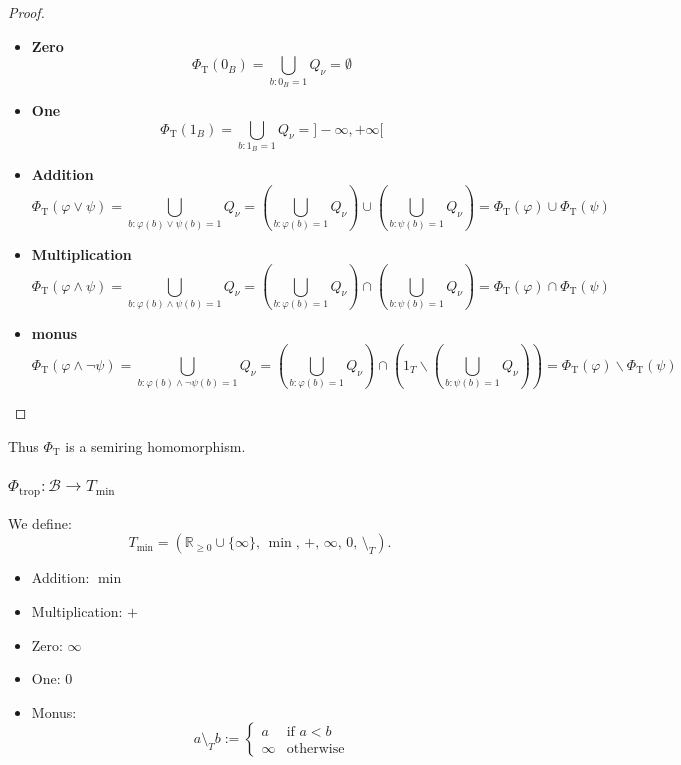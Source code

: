 \begin{proof}
\begin{itemize}
\item \textbf{Zero}
$$
\Phi_{\mathrm{T}}(0_B) = \bigcup_{b:0_B=1} Q_{\nu} = \emptyset
$$

\item
\textbf{One}
$$
\Phi_{\mathrm{T}}(1_B) = \bigcup_{b:1_B=1} Q_{\nu} = ]-\infty, +\infty[
$$
\item
\textbf{Addition}
$$
\Phi_{\mathrm{T}}(\varphi \lor \psi)
= \bigcup_{b: \varphi(b) \lor \psi(b) = 1} Q_{\nu}
= \left(\bigcup_{b: \varphi(b) = 1} Q_{\nu}\right) \cup \left(\bigcup_{b: \psi(b) = 1} Q_{\nu}\right)
= \Phi_{\mathrm{T}}(\varphi) \cup \Phi_{\mathrm{T}}(\psi)
$$
\item
\textbf{Multiplication}
$$
\Phi_{\mathrm{T}}(\varphi \land \psi)
= \bigcup_{b: \varphi(b) \land \psi(b) = 1} Q_{\nu}
= \left(\bigcup_{b: \varphi(b) = 1} Q_{\nu}\right) \cap \left(\bigcup_{b: \psi(b) = 1} Q_{\nu}\right)
= \Phi_{\mathrm{T}}(\varphi) \cap \Phi_{\mathrm{T}}(\psi)
$$
\item
\textbf{monus}
$$
\Phi_{\mathrm{T}}(\varphi \land \neg \psi)
= \bigcup_{b: \varphi(b) \land \neg \psi(b) = 1} Q_{\nu}
= \left(\bigcup_{b: \varphi(b) = 1} Q_{\nu}\right) \cap \left(1_T \backslash \left(\bigcup_{b: \psi(b) = 1} Q_{\nu}\right)\right)
= \Phi_{\mathrm{T}}(\varphi) \backslash \Phi_{\mathrm{T}}(\psi)
$$
    

\end{itemize}

\end{proof}

Thus $\Phi_{\mathrm{T}}$ is a semiring homomorphism.

\subsubsection{$\Phi_{\mathrm{trop}}: \mathcal{B} \to T_{\min}$}

We define:
$$
T_{\min} = (\mathbb{R}_{\ge 0} \cup \{\infty\},\,\min,\,+,\,\infty,\,0,\,\setminus_T).
$$
\begin{itemize}
    \item Addition: \(\min\)
    \item Multiplication: \(+\)
    \item Zero: \(\infty\)
    \item One: \(0\)
    \item Monus:
    \[
    a \setminus_T b :=
    \begin{cases}
        a & \text{if } a < b \\
        \infty & \text{otherwise}
    \end{cases}
    \]
\end{itemize}



